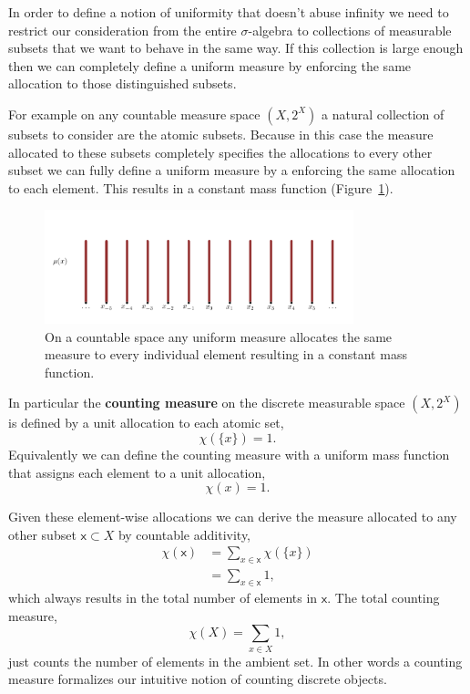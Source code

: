 \documentclass[
  letterpaper,
  DIV=11,
  numbers=noendperiod]{scrartcl}
\begin{document}
In order to define a notion of uniformity that doesn't abuse infinity we
need to restrict our consideration from the entire \(\sigma\)-algebra to
collections of measurable subsets that we want to behave in the same
way. If this collection is large enough then we can completely define a
uniform measure by enforcing the same allocation to those distinguished
subsets.

For example on any countable measure space \((X, 2^{X})\) a natural
collection of subsets to consider are the atomic subsets. Because in
this case the measure allocated to these subsets completely specifies
the allocations to every other subset we can fully define a uniform
measure by a enforcing the same allocation to each element. This results
in a constant mass function (Figure~\ref{fig-uniform-mass-function}).

\begin{figure}

{\centering \includegraphics[width=0.8\textwidth,height=\textheight]{figures/uniform_mass_function/uniform_mass_function.pdf}

}

\caption{\label{fig-uniform-mass-function}On a countable space any
uniform measure allocates the same measure to every individual element
resulting in a constant mass function.}

\end{figure}

In particular the \textbf{counting measure} on the discrete measurable
space \((X, 2^{X})\) is defined by a unit allocation to each atomic set,
\[
\chi(\{ x \}) = 1.
\] Equivalently we can define the counting measure with a uniform mass
function that assigns each element to a unit allocation, \[
\chi(x) = 1.
\]

Given these element-wise allocations we can derive the measure allocated
to any other subset \(\mathsf{x} \subset X\) by countable additivity,
\begin{align*}
\chi( \mathsf{x} )
&= \sum_{x \in \mathsf{x}} \chi(\{ x \})
\\
&= \sum_{x \in \mathsf{x}} 1,
\end{align*} which always results in the total number of elements in
\(\mathsf{x}\). The total counting measure, \[
\chi( X ) = \sum_{x \in X} 1,
\] just counts the number of elements in the ambient set. In other words
a counting measure formalizes our intuitive notion of counting discrete
objects.
\end{document}
